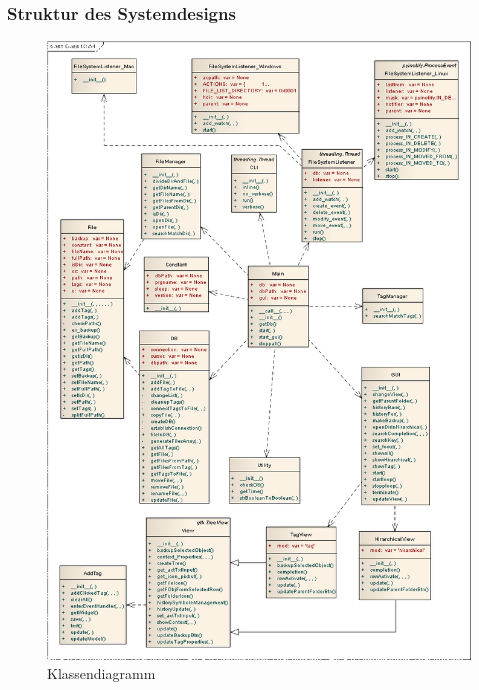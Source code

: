 \documentclass[10pt,paper=a4,final]{scrartcl}
\begin{document}
\subsubsection{Struktur des Systemdesigns}
\begin{figure}[h!]
\includegraphics[scale=0.54]{class.png}
\caption{Klassendiagramm}
\end{figure}
\newpage
\end{document}
